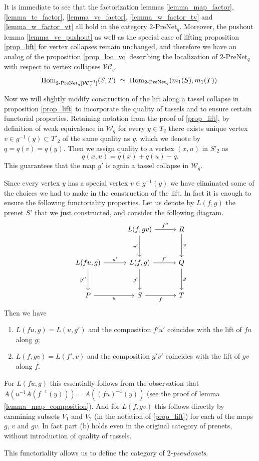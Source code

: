 \documentclass[letterpaper,12pt,leqno]{article}
\numberwithin{equation}{theorem}
\def\cW{\mathcal{W}}
\def\PreNet{\textrm{-}\mathrm{PreNet}}
\begin{document}
\begin{nparagraph}
It is immediate to see that the factorization lemmas \ref{lemma_map_factor}, \ref{lemma_tc_factor}, \ref{lemma_vc_factor}, \ref{lemma_w_factor_tv} and \ref{lemma_w_factor_vt} all hold in
the category $2\PreNet_q$. Moreover, the pushout lemma \ref{lemma_vc_pushout} as well as the special case of lifting proposition \ref{prop_lift} for vertex collapses remain unchanged,
and therefore we have an analog of the proposition \ref{prop_loc_vc} describing the localization of $2\PreNet_q$ with respect to vertex collapses $\mathcal{VC}_q$.
$$
\Hom_{2\PreNet_q[\mathcal{VC}_q^{-1}]}(S, T) \ \isom\ \Hom_{2\PreNet_q}(m_1(S), m_1(T)).
$$

\end{nparagraph}

\begin{nparagraph}
Now we will slightly modify construction of the lift along a tassel collapse in proposition \ref{prop_lift} to incorporate the quality of tassels and to ensure certain functorial properties.
Retaining notation from the proof of \ref{prop_lift}, by definition of weak equivalence in $\cW_q$ for every $y \in T_2$ there exists unique vertex $v \in g^{-1}(y) \subset T'_2$ of
the same quality as $y$, which we denote by $q = q(v) = q(y)$. Then we assign quality to a vertex $(x, u)$ in $S'_2$ as
$$
q(x, u) = q(x) + q(u) - q.
$$
This guarantees that the map $g'$ is again a tassel collapse in $\cW_q$.

Since every vertex $y$ has a special vertex $v \in g^{-1}(y)$ we have eliminated some of the choices we had to make in the construction of the lift. In fact it is enough to ensure the
following functoriality properties. Let us denote by $L(f, g)$ the prenet $S'$ that we just constructed, and consider the following diagram.
$$
\begin{tikzcd}[sep=3em]
& L(f, gv) \ar[d, "v'"'] \ar[r, "f''"] & R \ar[d, "v"] \\
L(fu, g) \ar[d, "g''"'] \ar[r, "u'"] & L(f, g) \ar[d, "g'"'] \ar[r, "f'"] & Q \ar[d, "g"] \\
P \ar[r, "u"'] & S \ar[r, "f"'] & T
\end{tikzcd}
$$
Then we have
\begin{enumerate}[label=\alph*)]
\item $L(fu, g) = L(u, g')$ and the composition $f'u'$ coincides with the lift of $fu$ along $g$;
\item $L(f, gv) = L(f', v)$ and the composition $g'v'$ coincides with the lift of $gv$ along $f$.
\end{enumerate}
For $L(fu, g)$ this essentially follows from the observation that $A(u^{-1}A(f^{-1}(y))) = A((fu)^{-1}(y))$ (see the proof of lemma \ref{lemma_map_composition}). And for $L(f, gv)$
this follows directly by examining subsets $V_1$ and $V_2$ (in the notation of \ref{prop_lift}) for each of the maps $g$, $v$ and $gv$. In fact part (b) holds even in the original
category of prenets, without introduction of quality of tassels.

This functoriality allows us to define the category of {\em $2$-pseudonets}.
\end{nparagraph}
\end{document}
